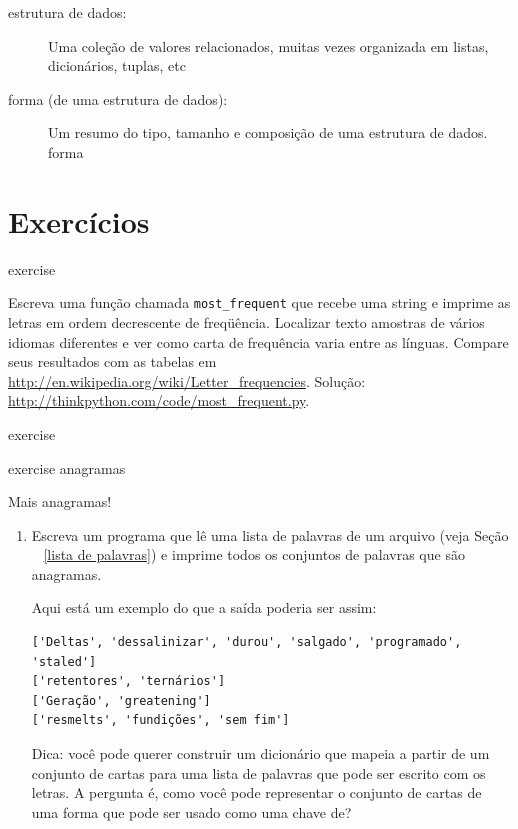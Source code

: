 \documentclass[10pt]{book}
\begin{document}
\begin{exercise}
\begin{v erbatim}
\begin{description}
\item[estrutura de dados:] Uma coleção de valores relacionados, muitas vezes
organizada em listas, dicionários, tuplas, etc

\item[forma (de uma estrutura de dados):] Um resumo do tipo,
tamanho e composição de uma estrutura de dados.
\index{} forma

\end{description}


\section{Exercícios}

\begin{} exercise

Escreva uma função chamada \verb "most_frequent" que recebe uma string e
imprime as letras em ordem decrescente de freqüência. Localizar texto
amostras de vários idiomas diferentes e ver como carta de frequência
varia entre as línguas. Compare seus resultados com as tabelas em
\url{http://en.wikipedia.org/wiki/Letter_frequencies}. Solução:
\url{http://thinkpython.com/code/most_frequent.py}.  

\end{} exercise


\begin{} exercise
\label{} anagramas

Mais anagramas!

\begin{enumerate}

\item Escreva um programa
que lê uma lista de palavras de um arquivo (veja Seção ~ \ref {lista de palavras}) e
imprime todos os conjuntos de palavras que são anagramas.

Aqui está um exemplo do que a saída poderia ser assim:

\begin{verbatim}
['Deltas', 'dessalinizar', 'durou', 'salgado', 'programado', 'staled']
['retentores', 'ternários']
['Geração', 'greatening']
['resmelts', 'fundições', 'sem fim']
\end{verbatim}
%
Dica: você pode querer construir um dicionário que mapeia a partir de um
conjunto de cartas para uma lista de palavras que pode ser escrito com os
letras. A pergunta é, como você pode representar o conjunto de
cartas de uma forma que pode ser usado como uma chave de?


\end{enumerate}
\end{}
\end{v erbatim}
\end{exercise}
\end{document}
